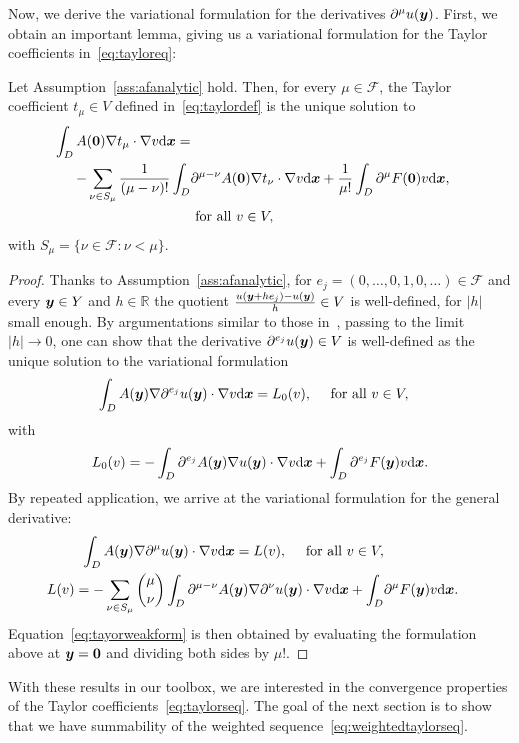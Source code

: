 Now, we derive the variational formulation for the derivatives $\partial^\mu {u}({\bm{y}})$.
First, we obtain an important lemma, giving us a variational formulation for the Taylor coefficients in~\eqref{eq:tayloreq}:
\begin{lemma}
	\label{col:taylorvar}
	Let Assumption~\ref{ass:afanalytic} hold.
	Then, for every $\mu \in \mathcal{F}$, the Taylor coefficient $t_\mu \in V$ defined in~\eqref{eq:taylordef} is the unique solution to
	\begin{align}
		\int_{{D}}  A(\bm{0}) \nabla t_{\mu} \cdot \nabla v \mathrm{d}{{\bm{x}}} = \\ -\sum_{\nu\in S_\mu} \frac{1}{(\mu - \nu)!} \int_{{D}} &\partial^{\mu - \nu} {A}(\bm{0}) \nabla t_\nu  \cdot \nabla v \mathrm{d}{{\bm{x}}} + \frac{1}{\mu!} \int_{{D}} \partial^\mu {F}(\bm{0})  v \mathrm{d}{{\bm{x}}}, \nonumber \\
		&\text{ for all } v \in V, \label{eq:tayorweakform}
	\end{align}
	with $S_\mu = \{\nu \in \mathcal{F} : \nu < \mu\}$.
\end{lemma}
\begin{proof}
	Thanks to Assumption~\ref{ass:afanalytic}, for $e_j=(0, \ldots, 0, 1, 0, \ldots )\in\mathcal{F}$ and every ${\bm{y}} \in Y$ and $h\in\mathbb{R}$ the quotient $\frac{u({\bm{y}}+he_j)-u({\bm{y}})}{h}\in V$ is well-defined, for $|h|$ small enough.
	By argumentations similar to those in~\cite{cohen2010}, passing to the limit $|h|\rightarrow 0$, one can show that the derivative $\partial^{e_j} u({\bm{y}}) \in V$ is well-defined as the unique solution to the variational formulation
	\begin{align}
		&\int_{{D}} {A}(\bm{y}) \nabla \partial^{e_j}{u}(\bm{y}) \cdot\nabla v \mathrm{d}{{\bm{x}}} = L_0(v), \quad \text{ for all } v \in V,\label{eq:singleder}
	\end{align}
	with
	\begin{align}
		L_0 (v)= -\int_{{D}} \partial^{e_j}{A}(\bm{y}) \nabla {u}(\bm{y})\cdot\nabla v\mathrm{d}{{\bm{x}}} + \int_{{D}}\partial^{e_j} {F}(\bm{y}) v\mathrm{d}{{\bm{x}}}.
	\end{align}
	By repeated application, we arrive at the variational formulation for the general derivative:
	\begin{align}
		\int_{{D}}  {A}(\bm{y}) \nabla\partial^{\mu} u(\bm{y})\cdot \nabla v \mathrm{d}{{\bm{x}}} = L(v) ,\nonumber \quad \text{ for all } v \in V, \\
		L(v) =  -\sum_{\nu\in S_\mu} \binom{\mu}{\nu} \int_{{D}} \partial^{\mu - \nu} {A}(\bm{y}) \nabla \partial^{\nu} u(\bm{y}) \cdot \nabla v \mathrm{d}{{\bm{x}}} + \int_{{D}}  &\partial^\mu {F}(\bm{y})v \mathrm{d}{{\bm{x}}}. \label{eq:gender}
	\end{align}
	Equation~\eqref{eq:tayorweakform} is then obtained by evaluating the formulation above at ${\bm{y}}=\bm{0}$ and dividing both sides by $\mu!$.
\end{proof}
With these results in our toolbox, we are interested in the convergence properties of the Taylor coefficients~\eqref{eq:taylorseq}.
The goal of the next section is to show that we have summability of the weighted sequence~\eqref{eq:weightedtaylorseq}.


